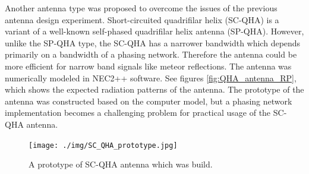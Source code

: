 \documentclass[twoside]{ctuthesis}
\theoremstyle{plain}
\theoremstyle{definition}
\theoremstyle{note}
\begin{document}
Another antenna type was proposed to overcome the issues of the previous antenna design experiment.  Short-circuited quadrifilar helix (SC-QHA) is a variant of a well-known self-phased quadrifilar helix antenna (SP-QHA). However, unlike the SP-QHA type, the  SC-QHA has a narrower bandwidth which depends primarily on a bandwidth of a phasing network. Therefore the antenna could be more efficient for narrow band signals like meteor reflections.  The antenna was numerically modeled in NEC2++ software. See figures \ref{fig:QHA_antenna_RP}, which shows the expected radiation patterns of the antenna.  The prototype of the antenna was constructed based on the computer model, but a phasing network implementation becomes a challenging problem for practical usage of the SC-QHA antenna. 

\begin{figure}
 \begin{center}
 \texttt{[image: ./img/SC\_QHA\_prototype.jpg]}
 \caption{A prototype of SC-QHA antenna which was build.}
  \label{fig:QHA_antenna} 
 \end{center}
\end{figure}
\end{document}
